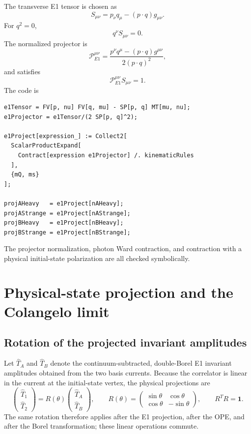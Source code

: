 \documentclass[11pt]{article}
\begin{document}
The transverse E1 tensor is chosen as
\begin{equation}
  S_{\mu\nu}=p_\nu q_\mu-(p\cdot q)g_{\mu\nu}.
\end{equation}
For $q^2=0$,
\begin{equation}
  q^\nu S_{\mu\nu}=0.
\end{equation}
The normalized projector is
\begin{equation}
  \mathcal P_{E1}^{\mu\nu}
  =\frac{p^\nu q^\mu-(p\cdot q)g^{\mu\nu}}
  {2(p\cdot q)^2},
\end{equation}
and satisfies
\begin{equation}
  \mathcal P_{E1}^{\mu\nu}S_{\mu\nu}=1.
\end{equation}
The code is
\begin{lstlisting}
e1Tensor = FV[p, nu] FV[q, mu] - SP[p, q] MT[mu, nu];
e1Projector = e1Tensor/(2 SP[p, q]^2);

e1Project[expression_] := Collect2[
  ScalarProductExpand[
    Contract[expression e1Projector] /. kinematicRules
  ],
  {mQ, ms}
];

projAHeavy   = e1Project[nAHeavy];
projAStrange = e1Project[nAStrange];
projBHeavy   = e1Project[nBHeavy];
projBStrange = e1Project[nBStrange];
\end{lstlisting}
The projector normalization, photon Ward contraction, and contraction with a
physical initial-state polarization are all checked symbolically.

\section{Physical-state projection and the Colangelo limit}

\subsection{Rotation of the projected invariant amplitudes}

Let $\widehat T_A$ and $\widehat T_B$ denote the continuum-subtracted,
double-Borel E1 invariant amplitudes obtained from the two basis currents.
Because the correlator is linear in the current at the initial-state vertex,
the physical projections are
\begin{equation}
  \begin{pmatrix}\widehat T_1\\[2pt]\widehat T_2\end{pmatrix}
  =R(\theta)
  \begin{pmatrix}\widehat T_A\\[2pt]\widehat T_B\end{pmatrix},
  \qquad
  R(\theta)=
  \begin{pmatrix}
    \sin\theta&\cos\theta\\
    \cos\theta&-\sin\theta
  \end{pmatrix},
  \qquad R^TR=\mathbf 1.
  \label{eq:state-rotation}
\end{equation}
The same rotation therefore applies after the E1 projection, after the OPE,
and after the Borel transformation; these linear operations commute.
\end{document}

